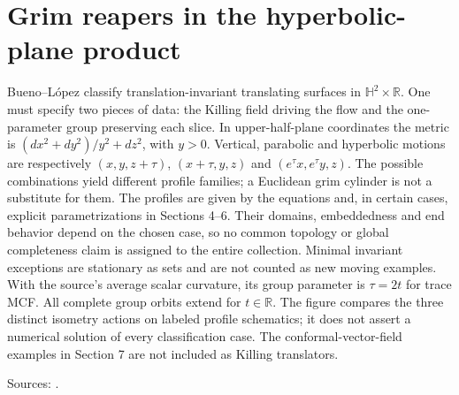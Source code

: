 \chapter{Grim reapers in the hyperbolic-plane product}\label{sec:catalogue-hyperbolic-product-grim-reapers}
\begin{example}\label{ex:catalogue-hyperbolic-product-grim-reapers}
Bueno--L\'opez classify translation-invariant translating surfaces in $\mathbb H^2\times\mathbb R$. One must specify two pieces of data: the Killing field driving the flow and the one-parameter group preserving each slice. In upper-half-plane coordinates the metric is $(dx^2+dy^2)/y^2+dz^2$, with $y>0$. Vertical, parabolic and hyperbolic motions are respectively $(x,y,z+\tau)$, $(x+\tau,y,z)$ and $(e^\tau x,e^\tau y,z)$. The possible combinations yield different profile families; a Euclidean grim cylinder is not a substitute for them.
The profiles are given by the equations and, in certain cases, explicit parametrizations in Sections 4–6. Their domains, embeddedness and end behavior depend on the chosen case, so no common topology or global completeness claim is assigned to the entire collection. Minimal invariant exceptions are stationary as sets and are not counted as new moving examples. With the source's average scalar curvature, its group parameter is $\tau=2t$ for trace MCF. All complete group orbits extend for $t\in\mathbb R$. The figure compares the three distinct isometry actions on labeled profile schematics; it does not assert a numerical solution of every classification case. The conformal-vector-field examples in Section 7 are not included as Killing translators.
\par Sources: \cite{CatBuenoLopez2024}.
\end{example}

